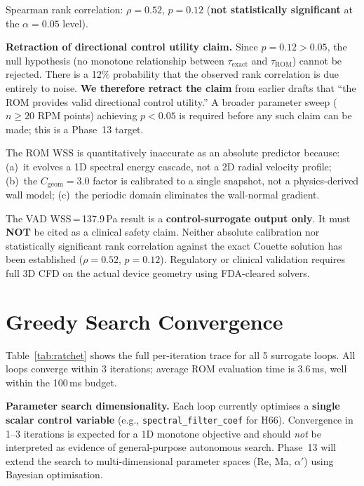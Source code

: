 \documentclass[10pt,twocolumn]{article}
\begin{document}
\noindent Spearman rank correlation: $\rho = 0.52$, $p = 0.12$
(\textbf{not statistically significant} at the $\alpha = 0.05$ level).

\noindent\textbf{Retraction of directional control utility claim.}
Since $p = 0.12 > 0.05$, the null hypothesis (no monotone relationship
between $\tau_{\mathrm{exact}}$ and $\tau_{\mathrm{ROM}}$) cannot be rejected.
There is a 12\% probability that the observed rank correlation is due
entirely to noise. \textbf{We therefore retract the claim} from earlier
drafts that ``the ROM provides valid directional control utility.''
A broader parameter sweep ($n \ge 20$ RPM points) achieving $p < 0.05$
is required before any such claim can be made; this is a Phase~13 target.

The ROM WSS is quantitatively inaccurate as an absolute predictor because:
(a)~it evolves a 1D spectral energy cascade, not a 2D radial velocity profile;
(b)~the $C_{\mathrm{geom}} = 3.0$ factor is calibrated to a single snapshot, not
a physics-derived wall model;
(c)~the periodic domain eliminates the wall-normal gradient.

\begin{tcolorbox}[colback=red!5, colframe=red!60!black, title=\textbf{Clinical Safety Warning}, fonttitle=\small\bfseries, boxrule=0.5pt, arc=3pt]
\small
The VAD WSS\,=\,137.9\,Pa result is a \textbf{control-surrogate output only}.
It must \textbf{NOT} be cited as a clinical safety claim. Neither absolute
calibration nor statistically significant rank correlation against the
exact Couette solution has been established ($\rho = 0.52$, $p = 0.12$).
Regulatory or clinical validation requires full 3D CFD on the actual device
geometry using FDA-cleared solvers.
\end{tcolorbox}

\section{Greedy Search Convergence}
\label{sec:ratchet}

Table~\ref{tab:ratchet} shows the full per-iteration trace for
all 5 surrogate loops. All loops converge within 3 iterations; average
ROM evaluation time is 3.6\,ms, well within the 100\,ms budget.

\noindent\textbf{Parameter search dimensionality.} Each loop currently optimises
a \textbf{single scalar control variable} (e.g., \texttt{spectral\_filter\_coef}
for H66). Convergence in 1--3 iterations is expected for a 1D monotone objective
and should \emph{not} be interpreted as evidence of general-purpose autonomous search.
Phase~13 will extend the search to multi-dimensional parameter spaces (Re, Ma, $\alpha'$)
using Bayesian optimisation.
\end{document}
